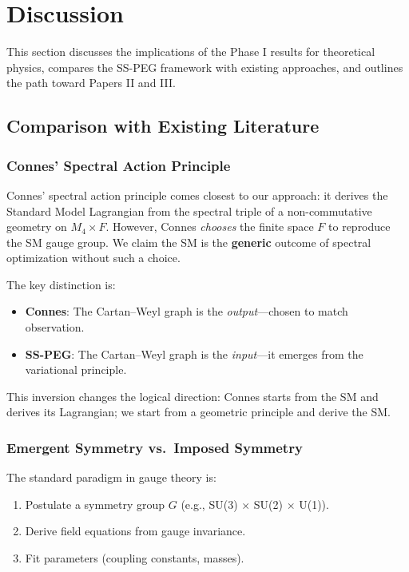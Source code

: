 \section{Discussion}\label{sec:discussion}

This section discusses the implications of the Phase I results for theoretical physics, compares the SS-PEG framework with existing approaches, and outlines the path toward Papers II and III.

\subsection{Comparison with Existing Literature}\label{sec:comparison_lit}

\subsubsection{Connes' Spectral Action Principle}

Connes' spectral action principle \cite{Connes1994,ConnesLott1990,ChamseddineConnes1997} comes closest to our approach: it derives the Standard Model Lagrangian from the spectral triple of a non-commutative geometry on $M_4 \times F$. However, Connes \textit{chooses} the finite space $F$ to reproduce the SM gauge group. We claim the SM is the \textbf{generic} outcome of spectral optimization without such a choice.

The key distinction is:

\begin{itemize}
\item \textbf{Connes}: The Cartan--Weyl graph is the \textit{output}---chosen to match observation.
\item \textbf{SS-PEG}: The Cartan--Weyl graph is the \textit{input}---it emerges from the variational principle.
\end{itemize}

This inversion changes the logical direction: Connes starts from the SM and derives its Lagrangian; we start from a geometric principle and derive the SM.

\subsubsection{Emergent Symmetry vs.\ Imposed Symmetry}

The standard paradigm in gauge theory is:

\begin{enumerate}
\item Postulate a symmetry group $G$ (e.g., SU(3) $\times$ SU(2) $\times$ U(1)).
\item Derive field equations from gauge invariance.
\item Fit parameters (coupling constants, masses).
\end{enumerate}

